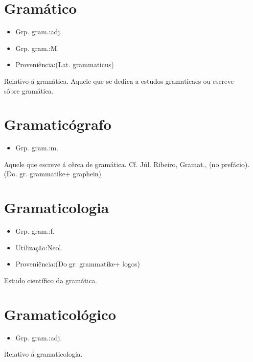 \section{Gramático}
\begin{itemize}
\item {Grp. gram.:adj.}
\end{itemize}
\begin{itemize}
\item {Grp. gram.:M.}
\end{itemize}
\begin{itemize}
\item {Proveniência:(Lat. \textunderscore grammaticus\textunderscore )}
\end{itemize}
Relativo á gramática.
Aquele que se dedica a estudos gramaticaes ou escreve sôbre gramática.
\section{Gramaticógrafo}
\begin{itemize}
\item {Grp. gram.:m.}
\end{itemize}
Aquele que escreve á cêrca de gramática. Cf. Júl. Ribeiro, \textunderscore Gramat.\textunderscore , (no prefácio).
(Do. gr. \textunderscore grammatike\textunderscore  + \textunderscore graphein\textunderscore )
\section{Gramaticologia}
\begin{itemize}
\item {Grp. gram.:f.}
\end{itemize}
\begin{itemize}
\item {Utilização:Neol.}
\end{itemize}
\begin{itemize}
\item {Proveniência:(Do gr. \textunderscore grammatike\textunderscore  + \textunderscore logos\textunderscore )}
\end{itemize}
Estudo científico da gramática.
\section{Gramaticológico}
\begin{itemize}
\item {Grp. gram.:adj.}
\end{itemize}
Relativo á gramaticologia.
